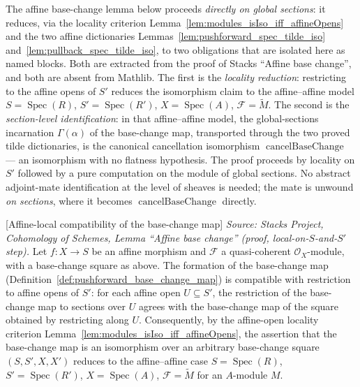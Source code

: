 The affine base-change lemma below proceeds \emph{directly on global sections}: it
reduces, via the locality criterion
Lemma~\ref{lem:modules_isIso_iff_affineOpens} and the two affine dictionaries
Lemmas~\ref{lem:pushforward_spec_tilde_iso} and~\ref{lem:pullback_spec_tilde_iso},
to two obligations that are isolated here as named blocks. Both are extracted from
the proof of Stacks ``Affine base change'', and both are absent from Mathlib. The
first is the \emph{locality reduction}: restricting to the affine opens of \(S'\)
reduces the isomorphism claim to the affine--affine model
\(S = \operatorname{Spec}(R)\), \(S' = \operatorname{Spec}(R')\),
\(X = \operatorname{Spec}(A)\), \(\mathcal{F} = \widetilde{M}\). The second is the
\emph{section-level identification}: in that affine--affine model, the global-sections
incarnation \(\Gamma(\alpha)\) of the base-change map, transported through the two
proved tilde dictionaries, is the canonical cancellation isomorphism
\(\operatorname{cancelBaseChange}\) — an isomorphism with no flatness hypothesis.
The proof proceeds by locality on \(S'\) followed by a pure computation on the module
of global sections. No abstract adjoint-mate identification at the level of sheaves is
needed; the mate is unwound \emph{on sections}, where it becomes
\(\operatorname{cancelBaseChange}\) directly.

\begin{lemma}


[Affine-local compatibility of the base-change map]
  \label{lem:base_change_map_affine_local}
  \textit{Source: Stacks Project, Cohomology of Schemes, Lemma ``Affine base
  change'' (proof, local-on-\(S\)-and-\(S'\) step).}
  Let \(f : X \to S\) be an affine morphism and \(\mathcal{F}\) a quasi-coherent
  \(\mathcal{O}_X\)-module, with a base-change square as above. The formation of the
  base-change map (Definition~\ref{def:pushforward_base_change_map}) is compatible
  with restriction to affine opens of \(S'\): for each affine open \(U \subseteq S'\), the
  restriction of the base-change map to sections over \(U\) agrees with the
  base-change map of the square obtained by restricting along \(U\). Consequently,
  by the affine-open locality criterion
  Lemma~\ref{lem:modules_isIso_iff_affineOpens}, the assertion that the base-change
  map is an isomorphism over an arbitrary base-change square \((S, S', X, X')\)
  reduces to the affine--affine case \(S = \operatorname{Spec}(R)\),
  \(S' = \operatorname{Spec}(R')\), \(X = \operatorname{Spec}(A)\),
  \(\mathcal{F} = \widetilde{M}\) for an \(A\)-module \(M\).

\end{lemma}


